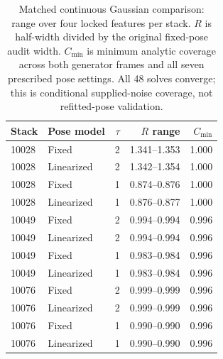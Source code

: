 \begin{table}[t]
\centering\small
\caption{Matched continuous Gaussian comparison: range over four locked features per stack. $R$ is half-width divided by the original fixed-pose audit width. $C_{\min}$ is minimum analytic coverage across both generator frames and all seven prescribed pose settings. All 48 solves converge; this is conditional supplied-noise coverage, not refitted-pose validation.}
\label{tab:matchedgaussian}
\begin{tabular}{llrrr}
\toprule
Stack & Pose model & $\tau$ & $R$ range & $C_{\min}$ \\
\midrule
10028 & Fixed & 2 & 1.341--1.353 & 1.000 \\
10028 & Linearized & 2 & 1.342--1.354 & 1.000 \\
10028 & Fixed & 1 & 0.874--0.876 & 1.000 \\
10028 & Linearized & 1 & 0.876--0.877 & 1.000 \\
10049 & Fixed & 2 & 0.994--0.994 & 0.996 \\
10049 & Linearized & 2 & 0.994--0.994 & 0.996 \\
10049 & Fixed & 1 & 0.983--0.984 & 0.996 \\
10049 & Linearized & 1 & 0.983--0.984 & 0.996 \\
10076 & Fixed & 2 & 0.999--0.999 & 0.996 \\
10076 & Linearized & 2 & 0.999--0.999 & 0.996 \\
10076 & Fixed & 1 & 0.990--0.990 & 0.996 \\
10076 & Linearized & 1 & 0.990--0.990 & 0.996 \\
\bottomrule
\end{tabular}
\end{table}
